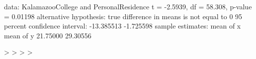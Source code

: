 \documentclass{article}
\begin{document}
\begin{Schunk}
\begin{Soutput}
data:  KalamazooCollege and PersonalResidence
t = -2.5939, df = 58.308, p-value = 0.01198
alternative hypothesis: true difference in means is not equal to 0
95 percent confidence interval:
 -13.385513  -1.725598
sample estimates:
mean of x mean of y 
 21.75000  29.30556 
\end{Soutput}
\begin{Sinput}
> 
> 
> 
> 
\end{Sinput}
\end{Schunk}
\end{document}
